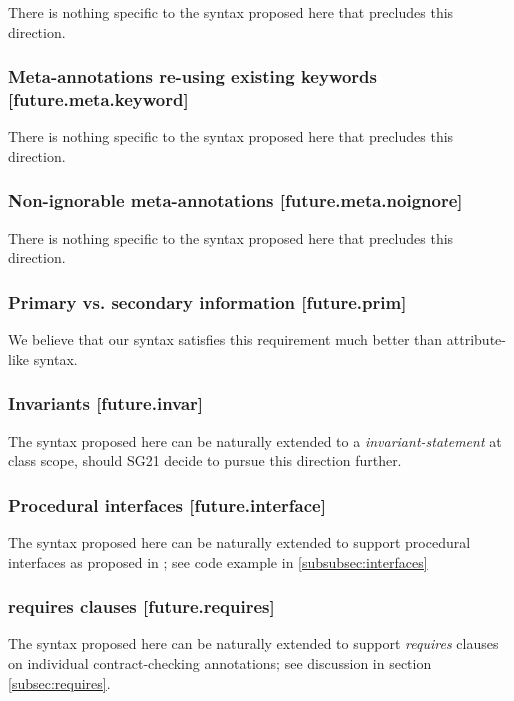 There is nothing specific to the syntax proposed here that precludes this direction.

\subsubsection{Meta-annotations re-using existing keywords  [future.meta.keyword]}

There is nothing specific to the syntax proposed here that precludes this direction.

\subsubsection{Non-ignorable meta-annotations  [future.meta.noignore]}

There is nothing specific to the syntax proposed here that precludes this direction.

\subsubsection{Primary vs. secondary information  [future.prim]}

We believe that our syntax satisfies this requirement much better than attribute-like syntax.

\subsubsection{Invariants  [future.invar]}

The syntax proposed here can be naturally extended to a \emph{invariant-statement} at class scope, should SG21 decide to pursue this direction further.

\subsubsection{Procedural interfaces  [future.interface]}

The syntax proposed here can be naturally extended to support procedural interfaces as proposed in \cite{P0465R0}; see code example in \ref{subsubsec:interfaces}

\subsubsection{requires clauses  [future.requires]}

The syntax proposed here can be naturally extended to support \emph{requires} clauses on individual contract-checking annotations; see discussion in section \ref{subsec:requires}.

